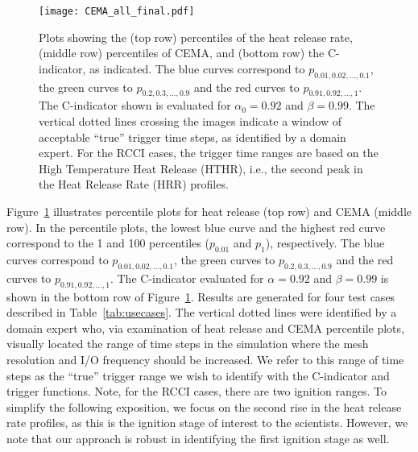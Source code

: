 \documentclass{sig-alternate}
\newcommand{\cmetric}{C}
\begin{document}
\begin{figure}[ht]
\begin{center}
\hspace*{-5ex}\texttt{[image: CEMA\_all\_final.pdf]}
\caption{\label{fig:CEMA} Plots showing the (top row) percentiles of the
heat release rate, (middle row) percentiles of CEMA, and (bottom row) the  \cmetric-indicator, as indicated.  The blue curves correspond to $p_{0.01, 0.02, \ldots , 0.1}$, the green curves to $p_{0.2, 0.3,  \ldots , 0.9}$ and the red curves to $p_{0.91, 0.92,  \ldots , 1}$. The \cmetric-indicator shown is
evaluated for $\alpha_0=0.92$ and $\beta=0.99$. The vertical dotted lines crossing the images indicate a window of
acceptable ``true'' trigger time steps, as identified by a domain expert.
For the RCCI cases, the trigger time ranges are based on the High Temperature
Heat Release (HTHR), i.e., the second peak in the Heat Release Rate (HRR) profiles.
}
\end{center}
\end{figure}

Figure~\ref{fig:CEMA} illustrates percentile plots for heat release (top row) and
CEMA
(middle row).  In the percentile plots, the lowest
blue curve and the highest red curve correspond to the 1 and
100 percentiles ($p_{0.01}$ and $p_{1}$), respectively. The blue curves
correspond to $p_{0.01, 0.02, \ldots, 0.1}$, the green curves to $p_{0.2, 0.3,  \ldots , 0.9}$
and the red curves to $p_{0.91, 0.92,  \ldots, 1}$. 
The \cmetric-indicator evaluated for $\alpha=0.92$ and
$\beta=0.99$  is shown in the bottom row of Figure~\ref{fig:CEMA}. 
Results are generated for four test cases described in Table~\ref{tab:usecases}.
The vertical dotted lines were identified  by a domain expert who, via examination
of heat release and CEMA percentile plots, visually
located the range of time steps in the simulation where the mesh resolution and I/O
frequency should  be increased. We refer to this range of time steps  
as the ``true'' trigger range we wish to identify with the 
\cmetric-indicator and trigger functions. Note, for the RCCI cases, there are
two ignition ranges.
To simplify the following exposition, we focus on the second rise in the heat release rate
profiles, as this is the ignition stage of interest to the scientists. However,
we note that our approach is robust in identifying the first ignition stage as
well.
\end{document}
